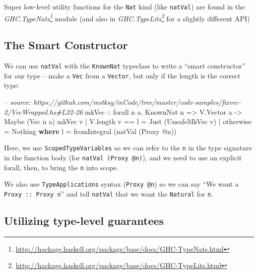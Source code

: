 \documentclass[]{article}
\newenvironment{Shaded}{}{}
\newcommand{\KeywordTok}[1]{\textcolor[rgb]{0.00,0.44,0.13}{\textbf{#1}}}
\newcommand{\DataTypeTok}[1]{\textcolor[rgb]{0.56,0.13,0.00}{#1}}
\newcommand{\CommentTok}[1]{\textcolor[rgb]{0.38,0.63,0.69}{\textit{#1}}}
\newcommand{\OtherTok}[1]{\textcolor[rgb]{0.00,0.44,0.13}{#1}}
\newcommand{\FunctionTok}[1]{\textcolor[rgb]{0.02,0.16,0.49}{#1}}
\newcommand{\NormalTok}[1]{#1}
\renewcommand{\href}[2]{#2\footnote{\url{#1}}}
\begin{document}
Super low-level utility functions for the \texttt{Nat} kind (like
\texttt{natVal}) are found in the
\emph{\href{http://hackage.haskell.org/package/base/docs/GHC-TypeNats.html}{GHC.TypeNats}}
module (and also in
\emph{\href{http://hackage.haskell.org/package/base/docs/GHC-TypeLits.html}{GHC.TypeLits}}
for a slightly different API)

\subsection{The Smart Constructor}\label{the-smart-constructor}

We can use \texttt{natVal} with the \texttt{KnownNat} typeclass to write a
``smart constructor'' for our type -- make a \texttt{Vec} from a
\texttt{Vector}, but only if the length is the correct type:

\begin{Shaded}
\begin{Highlighting}[]
\CommentTok{-- source: https://github.com/mstksg/inCode/tree/master/code-samples/fixvec-2/VecWrapped.hs#L22-26}
\OtherTok{mkVec ::}\NormalTok{ forall n a}\FunctionTok{.} \DataTypeTok{KnownNat}\NormalTok{ n }\OtherTok{=>} \DataTypeTok{V.Vector}\NormalTok{ a }\OtherTok{->} \DataTypeTok{Maybe}\NormalTok{ (}\DataTypeTok{Vec}\NormalTok{ n a)}
\NormalTok{mkVec v }\FunctionTok{|}\NormalTok{ V.length v }\FunctionTok{==}\NormalTok{ l }\FunctionTok{=} \DataTypeTok{Just}\NormalTok{ (}\DataTypeTok{UnsafeMkVec}\NormalTok{ v)}
        \FunctionTok{|}\NormalTok{ otherwise       }\FunctionTok{=} \DataTypeTok{Nothing}
  \KeywordTok{where}
\NormalTok{    l }\FunctionTok{=}\NormalTok{ fromIntegral (natVal (}\DataTypeTok{Proxy} \FunctionTok{@}\NormalTok{n))}
\end{Highlighting}
\end{Shaded}

Here, we use \texttt{ScopedTypeVariables} so we can refer to the \texttt{n} in
the type signature in the function body (for \texttt{natVal\ (Proxy\ @n)}), and
we need to use an explicit forall, then, to bring the \texttt{n} into scope.

We also use \texttt{TypeApplications} syntax (\texttt{Proxy\ @n}) so we can say
``We want a \texttt{Proxy\ ::\ Proxy\ n}'' and tell \texttt{natVal} that we want
the \texttt{Natural} for \texttt{n}.

\subsection{Utilizing type-level
guarantees}\label{utilizing-type-level-guarantees}
\end{document}

